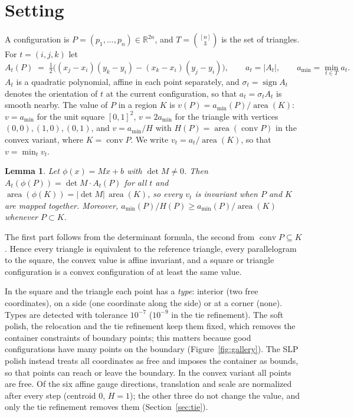 \documentclass[11pt]{article}
\newtheorem{lemma}{Lemma}
\theoremstyle{remark}
\newcommand{\conv}{\operatorname{conv}}
\newcommand{\area}{\operatorname{area}}
\newcommand{\amin}{a_{\min}}
\newcommand{\R}{\mathbb{R}}
\begin{document}
\section{Setting}\label{sec:setting}

A configuration is $P = (p_1, \dots, p_n) \in \R^{2n}$, and $T = \binom{[n]}{3}$ is the set of triangles. For
$t = (i,j,k)$ let
\[
  A_t(P) \;=\; \tfrac12 \bigl( (x_j - x_i)(y_k - y_i) - (x_k - x_i)(y_j - y_i) \bigr),
  \qquad a_t = |A_t|, \qquad \amin = \min_{t \in T} a_t .
\]
$A_t$ is a quadratic polynomial, affine in each point separately, and $\sigma_t = \operatorname{sign} A_t$ denotes the
orientation of $t$ at the current configuration, so that $a_t = \sigma_t A_t$ is smooth nearby. The value of $P$ in a
region $K$ is $v(P) = \amin(P)/\area(K)$: $v = \amin$ for the unit square $[0,1]^2$, $v = 2\amin$ for the triangle
with vertices $(0,0),(1,0),(0,1)$, and $v = \amin/H$ with $H(P) = \area(\conv P)$ in the convex variant, where
$K = \conv P$. We write $v_t = a_t / \area(K)$, so that $v = \min_t v_t$.

\begin{lemma}\label{lem:affine}
Let $\phi(x) = Mx + b$ with $\det M \neq 0$. Then $A_t(\phi(P)) = \det M \cdot A_t(P)$ for all $t$ and
$\area(\phi(K)) = |\det M|\,\area(K)$, so every $v_t$ is invariant when $P$ and $K$ are mapped together. Moreover,
$\amin(P)/H(P) \ge \amin(P)/\area(K)$ whenever $P \subset K$.
\end{lemma}

The first part follows from the determinant formula, the second from $\conv P \subseteq K$. Hence every triangle is
equivalent to the reference triangle, every parallelogram to the square, the convex value is affine invariant, and a
square or triangle configuration is a convex configuration of at least the same value.

In the square and the triangle each point has a \emph{type}: interior (two free coordinates), on a side (one
coordinate along the side) or at a corner (none). Types are detected with tolerance $10^{-7}$ ($10^{-9}$ in the tie
refinement). The soft polish, the relocation and the tie refinement keep them fixed, which removes the container
constraints of boundary points; this matters because good configurations have many points on the boundary
(Figure~\ref{fig:gallery}). The SLP polish instead treats all coordinates as free and imposes the container as bounds,
so that points can reach or leave the boundary. In the convex variant all points are free. Of the six affine gauge
directions, translation and scale are normalized after every step (centroid $0$, $H = 1$); the other three do not
change the value, and only the tie refinement removes them (Section~\ref{sec:tie}).
\end{document}
